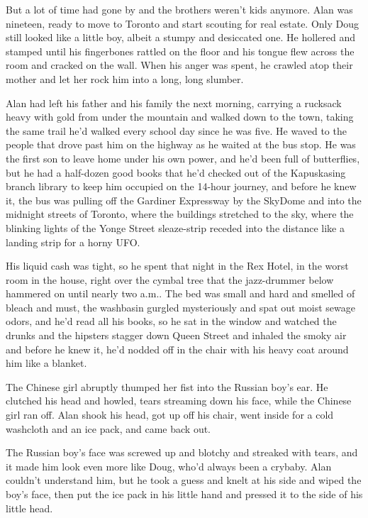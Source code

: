 But a lot of time had gone by and the brothers weren't kids anymore. 
Alan was nineteen, ready to move to Toronto and start scouting for
real estate.  Only Doug still looked like a little boy, albeit a
stumpy and desiccated one.  He hollered and stamped until his
fingerbones rattled on the floor and his tongue flew across the room
and cracked on the wall.  When his anger was spent, he crawled atop
their mother and let her rock him into a long, long slumber.

Alan had left his father and his family the next morning, carrying a
rucksack heavy with gold from under the mountain and walked down to
the town, taking the same trail he'd walked every school day since he
was five.  He waved to the people that drove past him on the highway
as he waited at the bus stop.  He was the first son to leave home
under his own power, and he'd been full of butterflies, but he had a
half-dozen good books that he'd checked out of the Kapuskasing branch
library to keep him occupied on the 14-hour journey, and before he
knew it, the bus was pulling off the Gardiner Expressway by the
SkyDome and into the midnight streets of Toronto, where the buildings
stretched to the sky, where the blinking lights of the Yonge Street
sleaze-strip receded into the distance like a landing strip for a
horny UFO.

His liquid cash was tight, so he spent that night in the Rex Hotel, in
the worst room in the house, right over the cymbal tree that the
jazz-drummer below hammered on until nearly two a.m..  The bed was
small and hard and smelled of bleach and must, the washbasin gurgled
mysteriously and spat out moist sewage odors, and he'd read all his
books, so he sat in the window and watched the drunks and the hipsters
stagger down Queen Street and inhaled the smoky air and before he knew
it, he'd nodded off in the chair with his heavy coat around him like a
blanket.

The Chinese girl abruptly thumped her fist into the Russian boy's ear. 
He clutched his head and howled, tears streaming down his face, while
the Chinese girl ran off.  Alan shook his head, got up off his chair,
went inside for a cold washcloth and an ice pack, and came back out.

The Russian boy's face was screwed up and blotchy and streaked with
tears, and it made him look even more like Doug, who'd always been a
crybaby.  Alan couldn't understand him, but he took a guess and knelt
at his side and wiped the boy's face, then put the ice pack in his
little hand and pressed it to the side of his little head.

